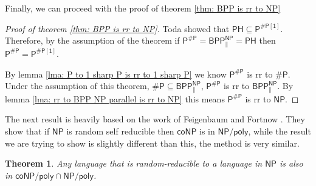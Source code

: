 \documentclass{article}
\newtheorem{theorem}{Theorem}
\begin{document}
Finally, we can proceed with the proof of theorem \ref{thm: BPP is rr to NP}

\begin{proof}[Proof of theorem \ref{thm: BPP is rr to NP}]
Toda \cite{toda1991pp} showed that $\mathsf{PH\subseteq P^{\# P[1]}}$. Therefore, by the assumption of the theorem if $\mathsf{P^{\# P}= BPP_{\parallel}^{NP}=PH}$ then $\mathsf{P^{\# P} = P^{\# P[1]}}$. 

By lemma \ref{lma: P to 1 sharp P is rr to 1 sharp P} we know $\mathsf{P^{\# P}}$ is rr to $\mathsf{\# P}$. Under the assumption of this theorem, $\mathsf{\# P \subseteq BPP^{NP}_{\parallel}}$, $\mathsf{P^{\# P}}$ is rr to $\mathsf{BPP^{NP}_{\parallel}}$. By lemma \ref{lma: rr to BPP NP parallel is rr to NP} this means $\mathsf{P^{\# P}}$ is rr to $\mathsf{NP}$.
\end{proof}

The next result is heavily based on the work of Feigenbaum and Fortnow \cite{feigenbaum1990random}. They show that if $\mathsf{NP}$ is random self reducible then $\mathsf{coNP}$ is in $\mathsf{NP/poly}$, while the result we are trying to show is slightly different than this, the method is very similar.

\begin{theorem}\label{thm: rr to NP is NP/poly}
    Any language that is random-reducible to a language in $\mathsf{NP}$ is also in $\mathsf{coNP/poly \cap NP/poly}$.
\end{theorem}
\end{document}
